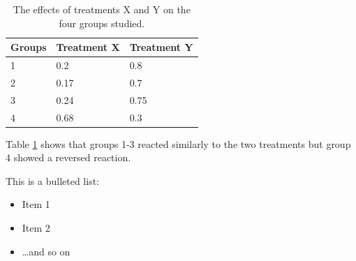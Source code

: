 \documentclass[idxtotoc,hyperref,openany]{labbook} %
\begin{document}


\lipsum[3-5]




\begin{table}[H]
\begin{tabular}{l l l}
\toprule
\textbf{Groups} & \textbf{Treatment X} & \textbf{Treatment Y} \\
\toprule
1 & 0.2 & 0.8\\
2 & 0.17 & 0.7\\
3 & 0.24 & 0.75\\
4 & 0.68 & 0.3\\
\bottomrule
\end{tabular}
\caption{The effects of treatments X and Y on the four groups studied.}
\label{tab:treatments_xy}
\end{table}

Table \ref{tab:treatments_xy} shows that groups 1-3 reacted similarly to the two treatments but group 4 showed a reversed reaction.




This is a bulleted list:

\begin{itemize}
\item Item 1
\item Item 2
\item \ldots and so on
\end{itemize}



\lipsum[6]



\lipsum[7]

\end{document}

